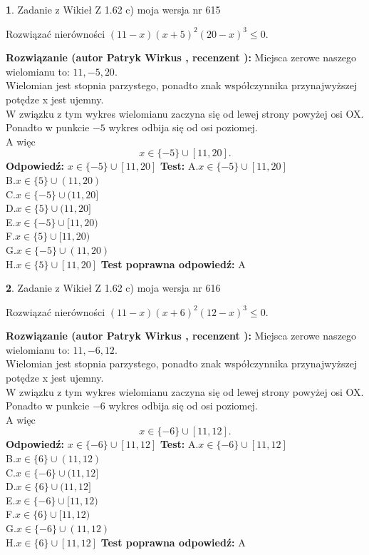 \documentclass[12pt, a4paper]{article}
\theoremstyle{definition} %
\newtheorem{zad}{}
\newcommand{\zadStart}[1]{\begin{zad}#1\newline}
\newcommand{\zadStop}{\end{zad}}
\newcommand{\rozwStart}[2]{\noindent \textbf{Rozwiązanie (autor #1 , recenzent #2): }\newline}
\newcommand{\rozwStop}{\newline}
\newcommand{\odpStart}{\noindent \textbf{Odpowiedź:}\newline}
\newcommand{\odpStop}{\newline}
\newcommand{\testStart}{\noindent \textbf{Test:}\newline}
\newcommand{\testStop}{\newline}
\newcommand{\kluczStart}{\noindent \textbf{Test poprawna odpowiedź:}\newline}
\newcommand{\kluczStop}{\newline}
\begin{document}
\zadStart{Zadanie z Wikieł Z 1.62 c) moja wersja nr 615}

Rozwiązać nierówności $(11-x)(x+5)^{2}(20-x)^{3}\le0$.
\zadStop
\rozwStart{Patryk Wirkus}{}
Miejsca zerowe naszego wielomianu to: $11, -5, 20$.\\
Wielomian jest stopnia parzystego, ponadto znak współczynnika przy\linebreak najwyższej potędze x jest ujemny.\\ W związku z tym wykres wielomianu zaczyna się od lewej strony powyżej osi OX.\\
Ponadto w punkcie $-5$ wykres odbija się od osi poziomej.\\
A więc $$x \in \{-5\} \cup [11,20].$$
\rozwStop
\odpStart
$x \in \{-5\} \cup [11,20]$
\odpStop
\testStart
A.$x \in \{-5\} \cup [11,20]$\\
B.$x \in \{5\} \cup (11,20)$\\
C.$x \in \{-5\} \cup (11,20]$\\
D.$x \in \{5\} \cup (11,20]$\\
E.$x \in \{-5\} \cup [11,20)$\\
F.$x \in \{5\} \cup [11,20)$\\
G.$x \in \{-5\} \cup (11,20)$\\
H.$x \in \{5\} \cup [11,20]$
\testStop
\kluczStart
A
\kluczStop



\zadStart{Zadanie z Wikieł Z 1.62 c) moja wersja nr 616}

Rozwiązać nierówności $(11-x)(x+6)^{2}(12-x)^{3}\le0$.
\zadStop
\rozwStart{Patryk Wirkus}{}
Miejsca zerowe naszego wielomianu to: $11, -6, 12$.\\
Wielomian jest stopnia parzystego, ponadto znak współczynnika przy\linebreak najwyższej potędze x jest ujemny.\\ W związku z tym wykres wielomianu zaczyna się od lewej strony powyżej osi OX.\\
Ponadto w punkcie $-6$ wykres odbija się od osi poziomej.\\
A więc $$x \in \{-6\} \cup [11,12].$$
\rozwStop
\odpStart
$x \in \{-6\} \cup [11,12]$
\odpStop
\testStart
A.$x \in \{-6\} \cup [11,12]$\\
B.$x \in \{6\} \cup (11,12)$\\
C.$x \in \{-6\} \cup (11,12]$\\
D.$x \in \{6\} \cup (11,12]$\\
E.$x \in \{-6\} \cup [11,12)$\\
F.$x \in \{6\} \cup [11,12)$\\
G.$x \in \{-6\} \cup (11,12)$\\
H.$x \in \{6\} \cup [11,12]$
\testStop
\kluczStart
A
\kluczStop
\end{document}
